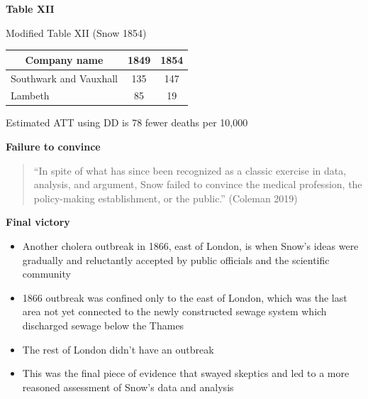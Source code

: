\documentclass[notes=show]{beamer}
\begin{document}
\begin{frame}[plain]

\begin{center}
\textbf{Table XII}
\end{center}

\begin{center}
\begin{large}Modified Table XII (Snow 1854) \end{large}
\footnotesize
\begin{tabular}{lcc}
\toprule
\multicolumn{1}{c}{\textbf{Company name}}&
\multicolumn{1}{c}{\textbf{1849}}&
\multicolumn{1}{c}{\textbf{1854}} \\
\midrule
Southwark and Vauxhall & 135 & 147\\
Lambeth	& 85 & 19 \\
\bottomrule
\end{tabular}
\end{center}

Estimated ATT using DD is 78 fewer deaths per 10,000

\end{frame}

\begin{frame}[plain]
\begin{center}
\textbf{Failure to convince}
\end{center}

\begin{quote}
``In spite of what has since been recognized as a classic exercise in data, analysis, and argument, Snow failed to convince the medical profession, the policy-making establishment, or the public.'' (Coleman 2019)
\end{quote}

\end{frame}

\begin{frame}[plain]
\begin{center}
\textbf{Final victory}
\end{center}

\begin{itemize}
\item Another cholera outbreak in 1866, east of London, is when Snow's ideas were gradually and reluctantly accepted by public officials and the scientific community
\item 1866 outbreak was confined only to the east of London, which was the last area not yet connected to the newly constructed sewage system which discharged sewage below the Thames
\item The rest of London didn't have an outbreak
\item This was the final piece of evidence that swayed skeptics and led to a more reasoned assessment of Snow's data and analysis
\end{itemize}

\end{frame}
\end{document}
